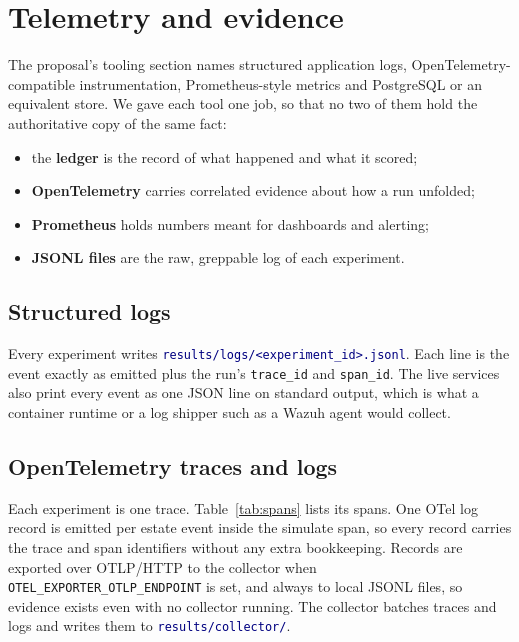 \documentclass[11pt]{article}
\newcommand{\code}[1]{\texttt{\small #1}}
\newcommand{\file}[1]{\textcolor{navy}{\texttt{\small #1}}}
\begin{document}
\section{Telemetry and evidence}
\label{sec:telemetry}
The proposal's tooling section names structured application logs,
OpenTelemetry-compatible instrumentation, Prometheus-style metrics and PostgreSQL
or an equivalent store. We gave each tool one job, so that no two of them hold
the authoritative copy of the same fact:
\begin{itemize}[leftmargin=1.4em,itemsep=1pt]
\item the \textbf{ledger} is the record of what happened and what it scored;
\item \textbf{OpenTelemetry} carries correlated evidence about how a run unfolded;
\item \textbf{Prometheus} holds numbers meant for dashboards and alerting;
\item \textbf{JSONL files} are the raw, greppable log of each experiment.
\end{itemize}

\subsection{Structured logs}
Every experiment writes \file{results/logs/<experiment\_id>.jsonl}. Each line is the
event exactly as emitted plus the run's \code{trace\_id} and \code{span\_id}. The
live services also print every event as one JSON line on standard output, which
is what a container runtime or a log shipper such as a Wazuh agent would collect.

\subsection{OpenTelemetry traces and logs}
Each experiment is one trace. Table~\ref{tab:spans} lists its spans. One OTel log
record is emitted per estate event inside the simulate span, so every record
carries the trace and span identifiers without any extra bookkeeping. Records are
exported over OTLP/HTTP to the collector when \code{OTEL\_EXPORTER\_OTLP\_ENDPOINT}
is set, and always to local JSONL files, so evidence exists even with no collector
running. The collector batches traces and logs and writes them to
\file{results/collector/}.
\end{document}
